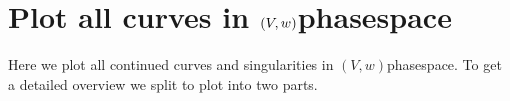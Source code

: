 \documentclass[letterpaper,10pt,english]{jupyterBook}
\begin{document}
\begin{sphinxVerbatim}[commandchars=\\\{\}]
\end{sphinxVerbatim}


\section{Plot all curves in \protect\((V,w)\protect\)\sphinxhyphen{}phase\sphinxhyphen{}space}
\label{\detokenize{Morris-Lecar:plot-all-curves-in-v-w-phase-space}}
\sphinxAtStartPar
Here we plot all continued curves and singularities in \((V,w)\)\sphinxhyphen{}phase\sphinxhyphen{}space. To
get a detailed overview we split to plot into two parts.
\end{document}
